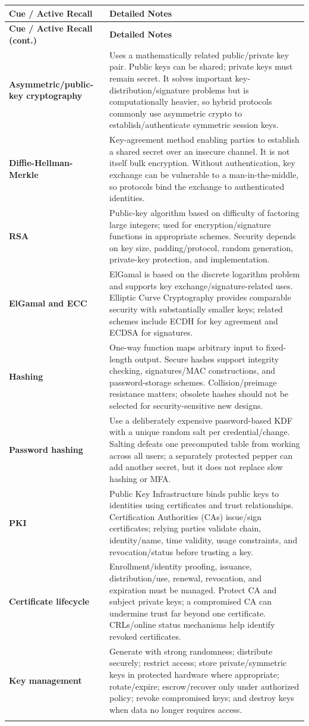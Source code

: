 \documentclass[10pt,letterpaper]{article}
\makeatletter
\newenvironment{cornell}{\rowcolors{2}{white}{notebg}\begin{longtable}{@{}>{\raggedright\arraybackslash\columncolor{cuebg}\color{navy}\bfseries}p{0.285\textwidth}>{\raggedright\arraybackslash}p{0.65\textwidth}@{}}
\rowcolor{navy}\color{white}\textbf{Cue / Active Recall} & \color{white}\textbf{Detailed Notes}\\ \hline\endfirsthead
\rowcolor{navy}\color{white}\textbf{Cue / Active Recall (cont.)} & \color{white}\textbf{Detailed Notes}\\ \hline\endhead}{\end{longtable}}
\newcommand{\noterow}[2]{#1 & #2\\\arrayrulecolor{line}\hline}
\makeatother
\begin{document}
\begin{cornell}
\noterow{Asymmetric/public-key cryptography}{Uses a mathematically related public/private key pair. Public keys can be shared; private keys must remain secret. It solves important key-distribution/signature problems but is computationally heavier, so hybrid protocols commonly use asymmetric crypto to establish/authenticate symmetric session keys.}
\noterow{Diffie-Hellman-Merkle}{Key-agreement method enabling parties to establish a shared secret over an insecure channel. It is not itself bulk encryption. Without authentication, key exchange can be vulnerable to a man-in-the-middle, so protocols bind the exchange to authenticated identities.}
\noterow{RSA}{Public-key algorithm based on difficulty of factoring large integers; used for encryption/signature functions in appropriate schemes. Security depends on key size, padding/protocol, random generation, private-key protection, and implementation.}
\noterow{ElGamal and ECC}{ElGamal is based on the discrete logarithm problem and supports key exchange/signature-related uses. Elliptic Curve Cryptography provides comparable security with substantially smaller keys; related schemes include ECDH for key agreement and ECDSA for signatures.}
\noterow{Hashing}{One-way function maps arbitrary input to fixed-length output. Secure hashes support integrity checking, signatures/MAC constructions, and password-storage schemes. Collision/preimage resistance matters; obsolete hashes should not be selected for security-sensitive new designs.}
\noterow{Password hashing}{Use a deliberately expensive password-based KDF with a unique random salt per credential/change. Salting defeats one precomputed table from working across all users; a separately protected pepper can add another secret, but it does not replace slow hashing or MFA.}
\noterow{PKI}{Public Key Infrastructure binds public keys to identities using certificates and trust relationships. Certification Authorities (CAs) issue/sign certificates; relying parties validate chain, identity/name, time validity, usage constraints, and revocation/status before trusting a key.}
\noterow{Certificate lifecycle}{Enrollment/identity proofing, issuance, distribution/use, renewal, revocation, and expiration must be managed. Protect CA and subject private keys; a compromised CA can undermine trust far beyond one certificate. CRLs/online status mechanisms help identify revoked certificates.}
\noterow{Key management}{Generate with strong randomness; distribute securely; restrict access; store private/symmetric keys in protected hardware where appropriate; rotate/expire; escrow/recover only under authorized policy; revoke compromised keys; and destroy keys when data no longer requires access.}

\end{cornell}
\end{document}
